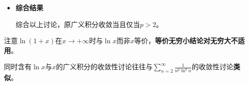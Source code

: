 \documentclass[a4paper,UTF8,fontset=windows,AutoFakeBold]{ctexart}
\newcommand*{\dr}{\hspace{0.07em}\mathrm{d}}
\newcommand*{\suminf}[1][n=1]{\sum_{#1}^\infty}
\newcommand*{\note}{\noindent *}
\theoremstyle{ex}
\begin{document}
\begin{framed}
{\begin{itemize}
        当$p>2$时，取定指数$1<c<\frac{p}{2}$，由\textbf{函数极限阶估算}结论(可见上学期讲义3.1第11题)可知
        $$\lim_{x\to+\infty}\frac{\frac{\ln^2x}{x^{p/2}}}{\frac{1}{x^c}}=\lim_{x\to+\infty}\frac{\ln^2x}{x^{p/2-c}}=0$$
        由\textbf{幂函数无穷积分}敛散性结论可知$\int_1^{+\infty}\frac{1}{x^c}\dr x$收敛，于是根据\textbf{比较判别法}得原广义积分在$+\infty$处也收敛。

        \item \textbf{综合结果}

        综合以上讨论，原广义积分收敛当且仅当$p>2$。
    \end{itemize}
}
\end{framed}

\note 注意$\ln(1+x)$在$x\to+\infty$时与$\ln x$而非$x$等价，\textbf{等价无穷小结论对无穷大不适用}。

\note 同时含有$\ln x$与$x$的广义积分的收敛性讨论往往与$\suminf[n=2]\frac{1}{n^p\ln^qn}$的收敛性讨论\textbf{类似}。
\end{document}
